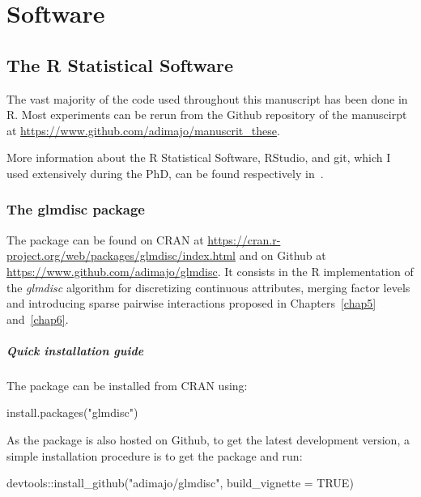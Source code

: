 \chapter{Software} \label{app2}

\section{The R Statistical Software}

The vast majority of the code used throughout this manuscript has been done in \textsf{R}. Most experiments can be rerun from the Github repository of the manuscirpt at \url{https://www.github.com/adimajo/manuscrit_these}.

More information about the \textsf{R} Statistical Software, RStudio, and git, which I used extensively during the PhD, can be found respectively in~\cite{prog_r_avance,gillespie_lovelace_2016,git_course}.

\subsection{The glmdisc package} \label{app2:glmdisc}

The  package can be found on CRAN at \url{https://cran.r-project.org/web/packages/glmdisc/index.html} and on Github at \url{https://www.github.com/adimajo/glmdisc}. It consists in the \textsf{R} implementation of the \textit{glmdisc} algorithm for discretizing continuous attributes, merging factor levels and introducing sparse pairwise interactions proposed in Chapters~\ref{chap5} and~\ref{chap6}.

\paragraph{Quick installation guide}

The package can be installed from CRAN using:
\begin{rlisting}
install.packages("glmdisc")
\end{rlisting}

As the package is also hosted on Github, to get the latest development version, a simple installation procedure is to get the  package and run:

\begin{rlisting}
devtools::install_github("adimajo/glmdisc", build_vignette = TRUE)
\end{rlisting}

